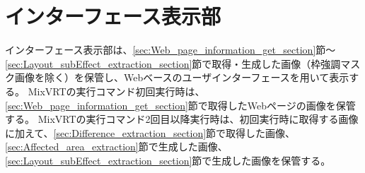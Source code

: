 \section{インターフェース表示部}\label{sec:Interface_Display_Section}
インターフェース表示部は、\ref{sec:Web_page_information_get_section}節～\ref{sec:Layout_subEffect_extraction_section}節で取得・生成した画像（枠強調マスク画像を除く）を保管し、Webベースのユーザインターフェースを用いて表示する。
MixVRTの実行コマンド初回実行時は、\ref{sec:Web_page_information_get_section}節で取得したWebページの画像を保管する。
MixVRTの実行コマンド2回目以降実行時は、初回実行時に取得する画像に加えて、\ref{sec:Difference_extraction_section}節で取得した画像、
\ref{sec:Affected_area_extraction}節で生成した画像、\ref{sec:Layout_subEffect_extraction_section}節で生成した画像を保管する。












